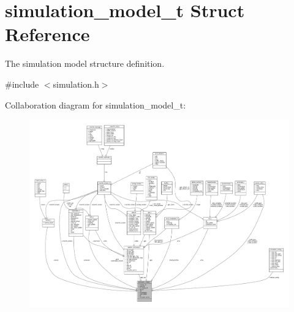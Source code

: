 \hypertarget{structsimulation__model__t}{\section{simulation\+\_\+model\+\_\+t Struct Reference}
\label{structsimulation__model__t}
}


The simulation model structure definition.  




{\ttfamily \#include $<$simulation.\+h$>$}



Collaboration diagram for simulation\+\_\+model\+\_\+t\+:
\nopagebreak
\begin{figure}[H]
\begin{center}
\leavevmode
\includegraphics[width=350pt]{structsimulation__model__t__coll__graph}
\end{center}
\end{figure}

